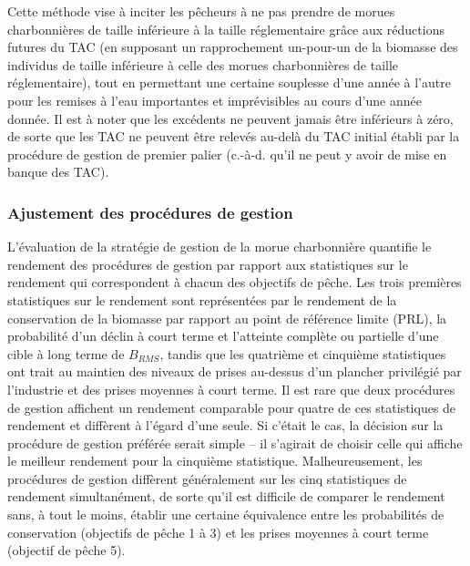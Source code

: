 \documentclass[11pt]{book}
\begin{document}
Cette méthode vise à inciter les pêcheurs à ne pas prendre de morues charbonnières de taille inférieure à la taille réglementaire grâce aux réductions futures du TAC (en supposant un rapprochement un-pour-un de la biomasse des individus de taille inférieure à celle des morues charbonnières de taille réglementaire), tout en permettant une certaine souplesse d'une année à l'autre pour les remises à l'eau importantes et imprévisibles au cours d'une année donnée. Il est à noter que les excédents ne peuvent jamais être inférieurs à zéro, de sorte que les TAC ne peuvent être relevés au-delà du TAC initial établi par la procédure de gestion de premier palier (c.-à-d. qu'il ne peut y avoir de mise en banque des TAC).

\hypertarget{ajustement-des-procuxe9dures-de-gestion}{%
\subsubsection{Ajustement des procédures de gestion}\label{ajustement-des-procuxe9dures-de-gestion}}

L'évaluation de la stratégie de gestion de la morue charbonnière quantifie le rendement des procédures de gestion par rapport aux statistiques sur le rendement qui correspondent à chacun des objectifs de pêche. Les trois premières statistiques sur le rendement sont représentées par le rendement de la conservation de la biomasse par rapport au point de référence limite (PRL), la probabilité d'un déclin à court terme et l'atteinte complète ou partielle d'une cible à long terme de \(B_{RMS}\), tandis que les quatrième et cinquième statistiques ont trait au maintien des niveaux de prises au-dessus d'un plancher privilégié par l'industrie et des prises moyennes à court terme. Il est rare que deux procédures de gestion affichent un rendement comparable pour quatre de ces statistiques de rendement et diffèrent à l'égard d'une seule. Si c'était le cas, la décision sur la procédure de gestion préférée serait simple -- il s'agirait de choisir celle qui affiche le meilleur rendement pour la cinquième statistique. Malheureusement, les procédures de gestion diffèrent généralement sur les cinq statistiques de rendement simultanément, de sorte qu'il est difficile de comparer le rendement sans, à tout le moins, établir une certaine équivalence entre les probabilités de conservation (objectifs de pêche 1 à 3) et les prises moyennes à court terme (objectif de pêche 5).
\end{document}

